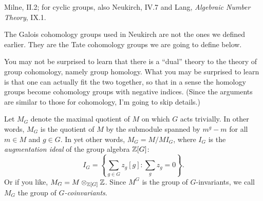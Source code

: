 %
%
%
%
%
%
%

 Milne, II.2; for cyclic groups, also
Neukirch, IV.7 and Lang, \emph{Algebraic Number Theory}, IX.1.

 The Galois cohomology groups used in Neukirch are
not the ones we defined earlier. They are the Tate cohomology groups we
are going to define below.


You may not be surprised to learn that there is a ``dual'' theory to the
theory of group cohomology, namely group homology. What you may be surprised
to learn is that one can actually fit the two together, so that in a sense
the homology groups become cohomology groups with negative indices. (Since the
arguments are similar to those for cohomology, I'm going to skip details.)

Let $M_G$ denote the maximal quotient of $M$ on which $G$ acts trivially.
In other words, $M_G$ is the quotient of $M$ by the submodule spanned by
$m^g-m$ for all $m \in M$ and $g \in G$. In yet other words,
$M_G = M/M I_G$, where $I_G$ is the \emph{augmentation ideal} of the
group algebra $\mathbb{Z}[G]$:
\[
I_G = \left\{\sum_{g \in G} z_g[g]: \sum_g z_g = 0\right\}.
\]
Or if you like, $M_G = M \otimes_{\mathbb{Z}[G]} \mathbb{Z}$. Since $M^G$ is the group
of $G$-invariants, we call $M_G$ the group of \emph{$G$-coinvariants}.

